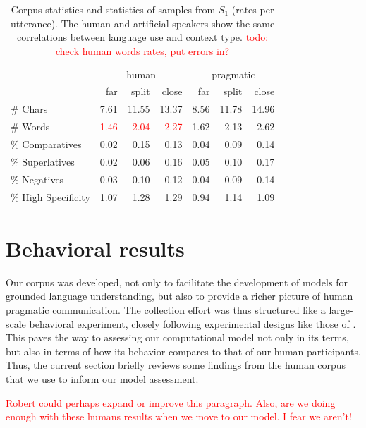 \documentclass[11pt,letterpaper]{article}
\newcommand{\Speaker}{S}
\renewcommand{\|}{\mid}
\newcommand{\todocheck}[1]{\textcolor{red}{#1}}
\begin{document}
\begin{table}[ht]
\centering
\begin{tabular}{lrrr@{\hspace{40pt}}rrr}
  \toprule
  & \multicolumn{3}{c}{human} & \multicolumn{3}{c}{pragmatic}\\
  & far& split& close& far& split& close\\
  \midrule
  \# Chars & 7.61 & 11.55 & 13.37 & 8.56 & 11.78 & 14.96 \\ 
  \# Words & \todocheck{1.46} & \todocheck{2.04} & \todocheck{2.27} & 1.62 & 2.13 & 2.62 \\ 
  \% Comparatives & 0.02 & 0.15 & 0.13 & 0.04 & 0.09 & 0.14 \\ 
  \% Superlatives & 0.02 & 0.06 & 0.16 & 0.05 & 0.10 & 0.17 \\ 
  \% Negatives & 0.03 & 0.10 & 0.12 & 0.04 & 0.09 & 0.14 \\ 
  \% High Specificity & 1.07 & 1.28 & 1.29 & 0.94 & 1.14 & 1.09 \\
  \bottomrule
\end{tabular}
\caption{Corpus statistics and statistics of samples from $\Speaker_1$
  (rates per utterance). The human and artificial speakers show
  the same correlations between language use and context type.
 \todocheck{todo: check human words rates, put errors in?}}
\label{table:metrics}
\end{table}


\section{Behavioral results}

Our corpus was developed, not only to facilitate the development of
models for grounded language understanding, but also to provide a
richer picture of human pragmatic communication. The collection effort
was thus structured like a large-scale behavioral experiment, closely
following experimental designs like those of
. This paves the way to assessing our
computational model not only in its terms, but also in terms of how
its behavior compares to that of our human participants. Thus, the
current section briefly reviews some findings from the human
corpus that we use to inform our model assessment.

\todocheck{Robert could perhaps expand or improve this paragraph. Also,
are we doing enough with these humans results when we move to our model.
I fear we aren't!}
\end{document}

